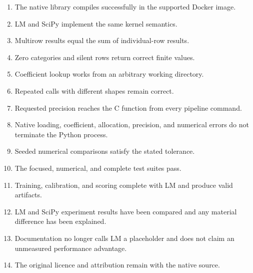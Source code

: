 \documentclass[11pt,a4paper]{article}
\begin{document}
\begin{enumerate}

\item The native library compiles successfully in the supported Docker image.

\item LM and SciPy implement the same kernel semantics.

\item Multirow results equal the sum of individual-row results.

\item Zero categories and silent rows return correct finite values.

\item Coefficient lookup works from an arbitrary working directory.

\item Repeated calls with different shapes remain correct.

\item Requested precision reaches the C function from every pipeline command.

\item Native loading, coefficient, allocation, precision, and numerical errors
do not terminate the Python process.

\item Seeded numerical comparisons satisfy the stated tolerance.

\item The focused, numerical, and complete test suites pass.

\item Training, calibration, and scoring complete with LM and produce valid
artifacts.

\item LM and SciPy experiment results have been compared and any material
difference has been explained.

\item Documentation no longer calls LM a placeholder and does not claim an
unmeasured performance advantage.

\item The original licence and attribution remain with the native source.

\end{enumerate}
\end{document}

